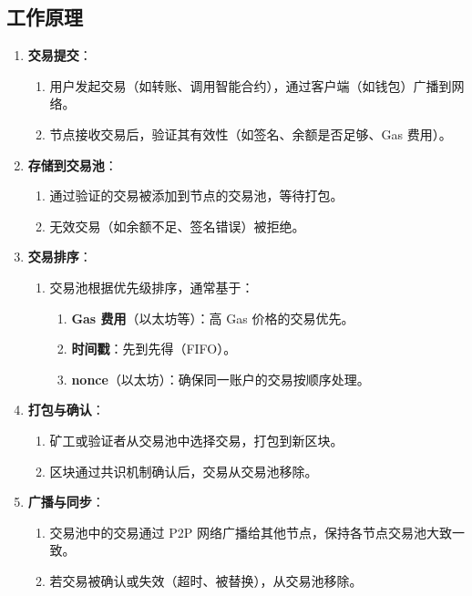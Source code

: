 \documentclass[12pt]{ctexart}
\begin{document}
\subsection{工作原理}
\begin{enumerate}
    \item \textbf{交易提交}：
        \begin{enumerate}
            \item 用户发起交易（如转账、调用智能合约），通过客户端（如钱包）广播到网络。
            \item 节点接收交易后，验证其有效性（如签名、余额是否足够、Gas 费用）。
        \end{enumerate}
    \item \textbf{存储到交易池}：
        \begin{enumerate}
            \item 通过验证的交易被添加到节点的交易池，等待打包。
            \item 无效交易（如余额不足、签名错误）被拒绝。
        \end{enumerate}
    \item \textbf{交易排序}：
        \begin{enumerate}
            \item 交易池根据优先级排序，通常基于：
                \begin{enumerate}
                    \item \textbf{Gas 费用}（以太坊等）：高 Gas 价格的交易优先。
                    \item \textbf{时间戳}：先到先得（FIFO）。
                    \item \textbf{nonce}（以太坊）：确保同一账户的交易按顺序处理。
                \end{enumerate}
        \end{enumerate}
    \item \textbf{打包与确认}：
        \begin{enumerate}
            \item 矿工或验证者从交易池中选择交易，打包到新区块。
            \item 区块通过共识机制确认后，交易从交易池移除。
        \end{enumerate}
    \item \textbf{广播与同步}：
        \begin{enumerate}
            \item 交易池中的交易通过 P2P 网络广播给其他节点，保持各节点交易池大致一致。
            \item 若交易被确认或失效（超时、被替换），从交易池移除。
        \end{enumerate}
\end{enumerate}
\end{document}
